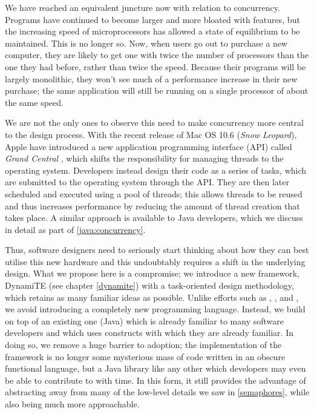 We have reached an equivalent juncture now with relation to
concurrency.  Programs have continued to become larger and more
bloated with features, but the increasing speed of microprocessors has
allowed a state of equilibrium to be maintained.  This is no longer
so.  Now, when users go out to purchase a new computer, they are
likely to get one with twice the number of processors than the one
they had before, rather than twice the speed.  Because their programs
will be largely monolithic, they won't see much of a performance
increase in their new purchase; the same application will still be
running on a single processor of about the same speed.

We are not the only ones to observe this need to make concurrency more
central to the design process.  With the recent release of Mac OS 10.6
(\emph{Snow Leopard}), Apple have introduced a new application
programming interface (API) called \emph{Grand Central}
\cite{grandcentral}, which shifts the responsibility for managing
threads to the operating system.  Developers instead design their code
as a series of tasks, which are submitted to the operating system
through the API.  They are then later scheduled and executed using a
pool of threads; this allows threads to be reused and thus increases
performance by reducing the amount of thread creation that takes
place.  A similar approach is available to Java developers, which we
discuss in detail as part of \ref{java:concurrency}.

Thus, software designers need to seriously start thinking about how
they can best utilise this new hardware and this undoubtably requires
a shift in the underlying design.  What we propose here is a
compromise; we introduce a new framework, DynamiTE (see chapter
\ref{dynamite}) with a task-oriented design methodology, which
retains as many familiar ideas as possible.  Unlike efforts such as
\cite{obliq}, \cite{daveturner:phd}, \cite{wojciechowski:phd} and
\cite{sangiorgi:safeambientsmachine}, we avoid introducing a
completely new programming language.  Instead, we build on top of an
existing one (Java) which is already familiar to many software
developers and which uses constructs with which they are already
familiar.  In doing so, we remove a huge barrier to adoption; the
implementation of the framework is no longer some mysterious mass of
code written in an obscure functional language, but a Java library
like any other which developers may even be able to contribute to with
time.  In this form, it still provides the advantage of abstracting
away from many of the low-level details we saw in \ref{semaphores},
while also being much more approachable.

